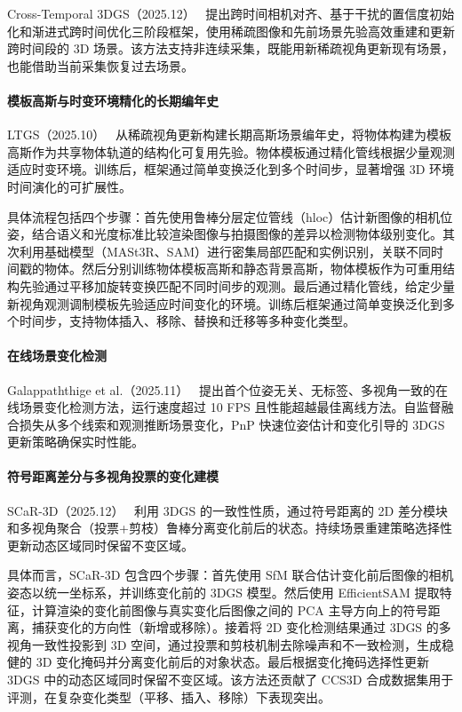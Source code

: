 Cross-Temporal 3DGS（2025.12）~\cite{2512_00534} 提出跨时间相机对齐、基于干扰的置信度初始化和渐进式跨时间优化三阶段框架，使用稀疏图像和先前场景先验高效重建和更新跨时间段的 3D 场景。该方法支持非连续采集，既能用新稀疏视角更新现有场景，也能借助当前采集恢复过去场景。

\paragraph{模板高斯与时变环境精化的长期编年史}

LTGS（2025.10）~\cite{2510_09881} 从稀疏视角更新构建长期高斯场景编年史，将物体构建为模板高斯作为共享物体轨道的结构化可复用先验。物体模板通过精化管线根据少量观测适应时变环境。训练后，框架通过简单变换泛化到多个时间步，显著增强 3D 环境时间演化的可扩展性。

具体流程包括四个步骤：首先使用鲁棒分层定位管线（hloc）估计新图像的相机位姿，结合语义和光度标准比较渲染图像与拍摄图像的差异以检测物体级别变化。其次利用基础模型（MASt3R、SAM）进行密集局部匹配和实例识别，关联不同时间戳的物体。然后分别训练物体模板高斯和静态背景高斯，物体模板作为可重用结构先验通过平移加旋转变换匹配不同时间步的观测。最后通过精化管线，给定少量新视角观测调制模板先验适应时间变化的环境。训练后框架通过简单变换泛化到多个时间步，支持物体插入、移除、替换和迁移等多种变化类型。

\paragraph{在线场景变化检测}

Galappaththige et al.（2025.11）~\cite{2511_12370} 提出首个位姿无关、无标签、多视角一致的在线场景变化检测方法，运行速度超过 10 FPS 且性能超越最佳离线方法。自监督融合损失从多个线索和观测推断场景变化，PnP 快速位姿估计和变化引导的 3DGS 更新策略确保实时性能。

\paragraph{符号距离差分与多视角投票的变化建模}

SCaR-3D（2025.12）~\cite{2512_22830} 利用 3DGS 的一致性性质，通过符号距离的 2D 差分模块和多视角聚合（投票+剪枝）鲁棒分离变化前后的状态。持续场景重建策略选择性更新动态区域同时保留不变区域。

具体而言，SCaR-3D 包含四个步骤：首先使用 SfM 联合估计变化前后图像的相机姿态以统一坐标系，并训练变化前的 3DGS 模型。然后使用 EfficientSAM 提取特征，计算渲染的变化前图像与真实变化后图像之间的 PCA 主导方向上的符号距离，捕获变化的方向性（新增或移除）。接着将 2D 变化检测结果通过 3DGS 的多视角一致性投影到 3D 空间，通过投票和剪枝机制去除噪声和不一致检测，生成稳健的 3D 变化掩码并分离变化前后的对象状态。最后根据变化掩码选择性更新 3DGS 中的动态区域同时保留不变区域。该方法还贡献了 CCS3D 合成数据集用于评测，在复杂变化类型（平移、插入、移除）下表现突出。

